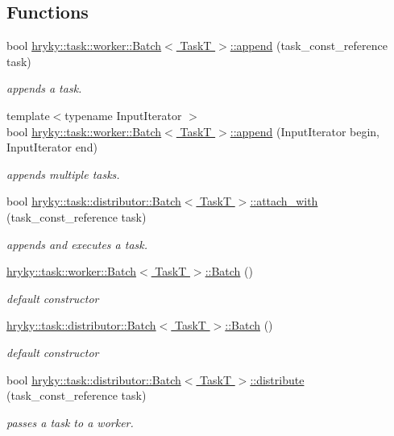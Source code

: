 \subsection*{Functions}
\begin{DoxyCompactItemize}
\item 
bool \hyperlink{group__task_gaef74f2d2dd44b8e13f615963ea1e1f0f}{hryky\-::task\-::worker\-::\-Batch$<$ Task\-T $>$\-::append} (task\-\_\-const\-\_\-reference task)
\begin{DoxyCompactList}\small\item\em appends a task. \end{DoxyCompactList}\item 
{\footnotesize template$<$typename Input\-Iterator $>$ }\\bool \hyperlink{group__task_gabb7f26f7fde9cb631988f9cf906d499f}{hryky\-::task\-::worker\-::\-Batch$<$ Task\-T $>$\-::append} (Input\-Iterator begin, Input\-Iterator end)
\begin{DoxyCompactList}\small\item\em appends multiple tasks. \end{DoxyCompactList}\item 
bool \hyperlink{group__task_ga54ecf037362d5f476c1cd9a984c1b720}{hryky\-::task\-::distributor\-::\-Batch$<$ Task\-T $>$\-::attach\-\_\-with} (task\-\_\-const\-\_\-reference task)
\begin{DoxyCompactList}\small\item\em appends and executes a task. \end{DoxyCompactList}\item 
\hyperlink{group__task_ga1e0c51798108868eef5a4f126640b4d7}{hryky\-::task\-::worker\-::\-Batch$<$ Task\-T $>$\-::\-Batch} ()
\begin{DoxyCompactList}\small\item\em default constructor \end{DoxyCompactList}\item 
\hyperlink{group__task_gabc2230b47631c13cfaa63fe5438b2b7f}{hryky\-::task\-::distributor\-::\-Batch$<$ Task\-T $>$\-::\-Batch} ()
\begin{DoxyCompactList}\small\item\em default constructor \end{DoxyCompactList}\item 
bool \hyperlink{group__task_gaaa80eb88fb7d7223214dd039ae52ed16}{hryky\-::task\-::distributor\-::\-Batch$<$ Task\-T $>$\-::distribute} (task\-\_\-const\-\_\-reference task)
\begin{DoxyCompactList}\small\item\em passes a task to a worker. \end{DoxyCompactList}\item 

\end{DoxyCompactItemize}
